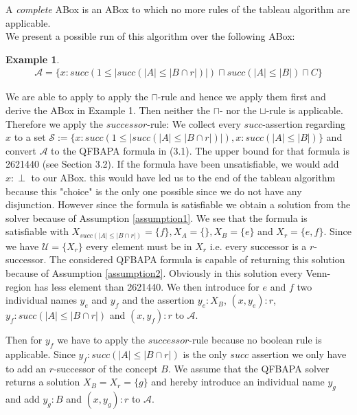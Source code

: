 \documentclass{book}
\theoremstyle{break}
\theoremstyle{definition}
\newtheorem{ex}{Example}
\begin{document}
A \textit{complete} ABox is an ABox to which no more rules of the tableau algorithm are applicable.\\
We present a possible run of this algorithm over the following ABox:
\begin{ex}
\begin{align*}
\mathcal{A}=\{x:succ(1\leq|succ(|A|\leq|B\cap r|)|)\sqcap succ(|A|\leq |B|)\sqcap C\}
\end{align*}
\end{ex}
We are able to apply to apply the $\sqcap$-rule and hence we apply them first and derive the ABox in Example 1. Then neither the $\sqcap$- nor the $\sqcup$-rule is applicable. Therefore we apply the $successor$-rule: We collect every $succ$-assertion regarding $x$ to a set $\mathcal{S}:=\{x:succ(1\leq|succ(|A|\leq|B\cap r|)|), x:succ(|A|\leq |B|)\}$ and convert $\mathcal{A}$ to the QFBAPA formula in (3.1). The upper bound for that formula is 2621440 (see Section 3.2). If the formula have been unsatisfiable, we would add $x:\perp$ to our ABox. this would have led us to the end of the tableau algorithm because this "choice" is the only one possible since we do not have any disjunction. However since the formula is satisfiable we obtain a solution from the solver because of Assumption \ref{assumption1}. We see that the formula is satisfiable with $X_{succ(|A|\leq |B\cap r|)}=\{f\},X_A=\{\},X_B=\{e\}$ and $X_r=\{e,f\}$. Since we have $\mathcal{U}=\{X_r\}$ every element must be in $X_r$ i.e. every successor is a $r$-successor. The considered QFBAPA formula is capable of returning this solution because of Assumption \ref{assumption2}. Obviously in this solution every Venn-region has less element than 2621440. We then introduce for $e$ and $f$ two individual names $y_e$ and $y_f$ and the assertion $y_e:X_B$, $(x,y_e):r$, $y_f:succ(|A|\leq|B\cap r|)$ and $(x,y_f):r$ to $\mathcal{A}$. 
\begin{figure}[H]
\centering
{}
\end{figure}
Then for $y_f$ we have to apply the $successor$-rule because no boolean rule is applicable. Since $y_f:succ(|A|\leq |B\cap r|)$ is the only $succ$ assertion we only have to add an $r$-successor of the concept $B$. We assume that the QFBAPA solver returns a solution $X_B=X_r=\{g\}$ and hereby introduce an individual name $y_g$ and add $y_g:B$ and $(x,y_g):r$ to $\mathcal{A}$.
\end{document}
